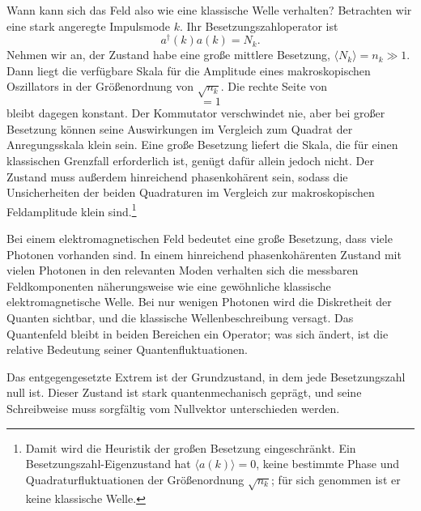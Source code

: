 Wann kann sich das Feld also wie eine klassische Welle verhalten? Betrachten wir eine stark angeregte Impulsmode \(k\). Ihr Besetzungszahloperator ist
\begin{equation}
a^\dagger(k)a(k)=N_k.
\end{equation}
Nehmen wir an, der Zustand habe eine große mittlere Besetzung, \(\langle N_k\rangle=n_k\gg 1\). Dann liegt die verfügbare Skala für die Amplitude eines makroskopischen Oszillators in der Größenordnung von \(\sqrt{n_k}\). Die rechte Seite von
\begin{equation}
[a(k),a^\dagger(k)]=1
\end{equation}
bleibt dagegen konstant. Der Kommutator verschwindet nie, aber bei großer Besetzung können seine Auswirkungen im Vergleich zum Quadrat der Anregungsskala klein sein. Eine große Besetzung liefert die Skala, die für einen klassischen Grenzfall erforderlich ist, genügt dafür allein jedoch nicht. Der Zustand muss außerdem hinreichend phasenkohärent sein, sodass die Unsicherheiten der beiden Quadraturen im Vergleich zur makroskopischen Feldamplitude klein sind.\footnote{Damit wird die Heuristik der großen Besetzung eingeschränkt. Ein Besetzungszahl-Eigenzustand hat \(\langle a(k)\rangle=0\), keine bestimmte Phase und Quadraturfluktuationen der Größenordnung \(\sqrt{n_k}\); für sich genommen ist er keine klassische Welle.}

Bei einem elektromagnetischen Feld bedeutet eine große Besetzung, dass viele Photonen vorhanden sind. In einem hinreichend phasenkohärenten Zustand mit vielen Photonen in den relevanten Moden verhalten sich die messbaren Feldkomponenten näherungsweise wie eine gewöhnliche klassische elektromagnetische Welle. Bei nur wenigen Photonen wird die Diskretheit der Quanten sichtbar, und die klassische Wellenbeschreibung versagt. Das Quantenfeld bleibt in beiden Bereichen ein Operator; was sich ändert, ist die relative Bedeutung seiner Quantenfluktuationen.

\begin{classroomqa}
\end{classroomqa}

Das entgegengesetzte Extrem ist der Grundzustand, in dem jede Besetzungszahl null ist. Dieser Zustand ist stark quantenmechanisch geprägt, und seine Schreibweise muss sorgfältig vom Nullvektor unterschieden werden.


